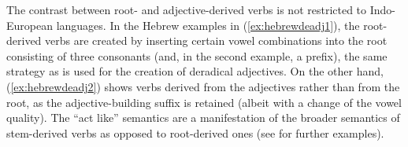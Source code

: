 \documentclass[output=paper,colorlinks,citecolor=brown]{langscibook}
\begin{document}
The contrast between root- and adjective-derived verbs is not restricted to Indo-European languages. In the  Hebrew examples in (\ref{ex:hebrewdeadj1}), the root-derived verbs are created by inserting certain vowel combinations into the root consisting of three consonants (and, in the second example, a prefix), the same strategy as is used for the creation of deradical adjectives. On the other hand, (\ref{ex:hebrewdeadj2}) shows verbs derived from the adjectives rather than from the root, as the adjective-building suffix  is retained (albeit with a change of the vowel quality). The ``act like'' semantics are a manifestation of the broader semantics of stem-derived verbs as opposed to root-derived ones (see  \citealt[194--195]{Kastner2020} for further examples).
\end{document}
